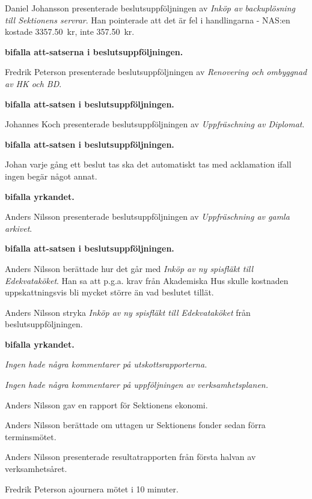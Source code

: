 \documentclass[10pt]{article}
\begin{document}
\begin{paragrafer}
Daniel Johansson presenterade beslutsuppföljningen av \emph{Inköp av backuplösning till Sektionens servrar}. Han pointerade att det är fel i handlingarna - NAS:en kostade \SI{3357.50}{kr}, inte \SI{357.50}{kr}.

\textbf{\Mba bifalla att-satserna i beslutsuppföljningen.}

Fredrik Peterson presenterade beslutsuppföljningen av \emph{Renovering och ombyggnad av HK och BD}.

\textbf{\Mba bifalla att-satsen i beslutsuppföljningen.}

Johannes Koch presenterade beslutsuppföljningen av \emph{Uppfräschning av Diplomat}.

\textbf{\Mba bifalla att-satsen i beslutsuppföljningen.}

Johan \ypa varje gång ett beslut tas ska det automatiskt tas med acklamation ifall ingen begär något annat.

\textbf{\Mba bifalla yrkandet.}

Anders Nilsson presenterade beslutsuppföljningen av \emph{Uppfräschning av gamla arkivet}.

\textbf{\Mba bifalla att-satsen i beslutsuppföljningen.}

Anders Nilsson berättade hur det går med \emph{Inköp av ny spisfläkt till Edekvataköket}. Han sa att p.g.a. krav från Akademiska Hus skulle kostnaden uppskattningsvis bli mycket större än vad beslutet tillät.

Anders Nilsson \ypa stryka \emph{Inköp av ny spisfläkt till Edekvataköket} från beslutsuppföljningen.

\textbf{\Mba bifalla yrkandet.}

\emph{Ingen hade några kommentarer på utskottsrapporterna.}

\emph{Ingen hade några kommentarer på uppföljningen av verksamhetsplanen.}

Anders Nilsson gav en rapport för Sektionens ekonomi.

Anders Nilsson berättade om uttagen ur Sektionens fonder sedan förra terminsmötet.

Anders Nilsson presenterade resultatrapporten från första halvan av verksamhetsåret.

Fredrik Peterson \ypa ajournera mötet i 10 minuter.


\end{paragrafer}
\end{document}
